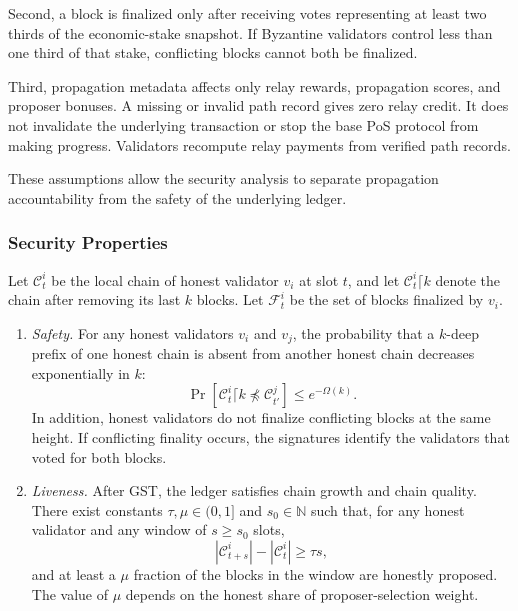 \documentclass[lettersize,journal]{IEEEtran}
\begin{document}
Second, a block is finalized only after receiving votes representing at least two thirds of the economic-stake snapshot.
If Byzantine validators control less than one third of that stake, conflicting blocks cannot both be finalized.

Third, propagation metadata affects only relay rewards, propagation scores, and proposer bonuses.
A missing or invalid path record gives zero relay credit.
It does not invalidate the underlying transaction or stop the base PoS protocol from making progress.
Validators recompute relay payments from verified path records.

These assumptions allow the security analysis to separate propagation accountability from the safety of the underlying ledger.

\subsubsection{Security Properties}
\label{subsec:security_def}

Let $\mathcal{C}_t^i$ be the local chain of honest validator $v_i$ at slot $t$,
and let $\mathcal{C}_t^i\lceil k$ denote the chain after removing its last $k$ blocks.
Let $\mathcal{F}_t^i$ be the set of blocks finalized by $v_i$.

\begin{enumerate}
\item \textit{Safety.}
For any honest validators $v_i$ and $v_j$, the probability that a $k$-deep prefix of one honest chain is absent from another honest chain decreases exponentially in $k$:
\begin{equation}
\Pr\!\left[
\mathcal{C}_t^i\lceil k
\not\preceq
\mathcal{C}_{t'}^j
\right]
\leq
e^{-\Omega(k)}.
\end{equation}
In addition, honest validators do not finalize conflicting blocks at the same height.
If conflicting finality occurs, the signatures identify the validators that voted for both blocks.

\item \textit{Liveness.}
After GST, the ledger satisfies chain growth and chain quality.
There exist constants $\tau,\mu\in(0,1]$ and $s_0\in\mathbb{N}$ such that, for any honest validator and any window of $s\geq s_0$ slots,
\begin{equation}
|\mathcal{C}_{t+s}^i|-|\mathcal{C}_t^i|
\geq
\tau s,
\end{equation}
and at least a $\mu$ fraction of the blocks in the window are honestly proposed.
The value of $\mu$ depends on the honest share of proposer-selection weight.
\end{enumerate}
\end{document}
